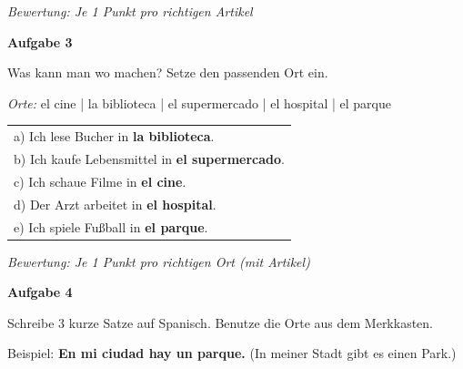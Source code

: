 \documentclass[11pt, a4paper]{article}
\newcommand{\fachfarbe}{spanisch}
\newcommand{\punktebox}[1]{\hfill\fbox{\small \_/#1}}
\newcommand{\loesung}[1]{\textcolor{loesung}{\textbf{#1}}}
\newenvironment{aufgabe}[1]{%
    \needspace{5\baselineskip}%
    \nopagebreak[4]%
    \vspace{10pt}
    \noindent\textbf{\textcolor{\fachfarbe}{Aufgabe #1}}
    \nopagebreak[4]%
    \vspace{5pt}
    \nopagebreak[4]%
    \begin{list}{}{\leftmargin=0pt}
    \item[]
}{%
    \end{list}
}
\newcommand{\es}[1]{\textcolor{\fachfarbe}{\textbf{#1}}}
\begin{document}
\vspace{0.5em}
\textit{\textcolor{grau}{Bewertung: Je 1 Punkt pro richtigen Artikel}}

\vspace{15pt}


\begin{aufgabe}{3}
Was kann man wo machen? Setze den passenden Ort ein. \punktebox{5}
\end{aufgabe}

\begin{vokabelkasten}
\textit{Orte:} el cine | la biblioteca | el supermercado | el hospital | el parque
\end{vokabelkasten}

\vspace{0.5em}

\noindent
\renewcommand{\arraystretch}{1.8}
\begin{tabular}{p{\textwidth}}
a) Ich lese Bucher in \loesung{la biblioteca}. \\
b) Ich kaufe Lebensmittel in \loesung{el supermercado}. \\
c) Ich schaue Filme in \loesung{el cine}. \\
d) Der Arzt arbeitet in \loesung{el hospital}. \\
e) Ich spiele Fußball in \loesung{el parque}. \\
\end{tabular}

\vspace{0.5em}
\textit{\textcolor{grau}{Bewertung: Je 1 Punkt pro richtigen Ort (mit Artikel)}}

\vspace{15pt}


\begin{aufgabe}{4}
Schreibe 3 kurze Satze auf Spanisch. Benutze die Orte aus dem Merkkasten. \punktebox{5}
\end{aufgabe}

\begin{hinweis}
Beispiel: \es{En mi ciudad hay un parque.} (In meiner Stadt gibt es einen Park.)
\end{hinweis}
\end{document}
